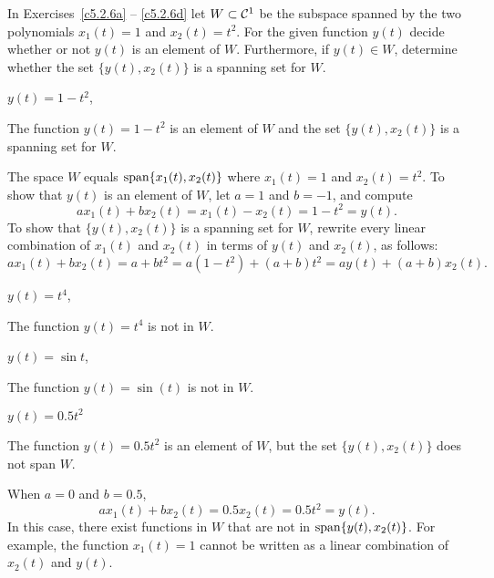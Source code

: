 \documentclass{ximera}
\begin{document}
\noindent In Exercises~\ref{c5.2.6a} -- \ref{c5.2.6d} let $W\subset{\cal C}^1$
be the subspace spanned by the two polynomials $x_1(t) = 1$ and
$x_2(t)=t^2$.  For the given function $y(t)$ decide whether or not $y(t)$
is an element of $W$.  Furthermore, if $y(t)\in W$, determine whether the set
$\{y(t),x_2(t)\}$ is a spanning set for $W$.
\begin{exercise} \label{c5.2.6a}
$y(t) = 1-t^2$,

\begin{solution}

\ans The function $y(t) = 1 - t^2$ is an element of $W$ and the set
$\{y(t),x_2(t)\}$ is a spanning set for $W$.



\soln The space $W$ equals ${\rm span}\{x_1(t),x_2(t)\}$ where $x_1(t)=1$ and 
$x_2(t)=t^2$.  To show that $y(t)$ is an element of $W$, let
$a = 1$ and $b = -1$, and compute
\[
ax_1(t) + bx_2(t) = x_1(t) - x_2(t) = 1 - t^2 = y(t). 
\]
To show that $\{y(t),x_2(t)\}$ is a spanning set for $W$, rewrite every
linear combination of $x_1(t)$ and $x_2(t)$ in terms of $y(t)$ and $x_2(t)$, 
as follows:
\[ 
ax_1(t) + bx_2(t) = a + bt^2 = a(1 - t^2) + (a + b)t^2
= ay(t) + (a + b)x_2(t). 
\]

\end{solution}
\end{exercise}
\begin{exercise} \label{c5.2.6b}
$y(t) = t^4$,

\begin{solution}
The function $y(t) = t^4$ is not in $W$.

\end{solution}
\end{exercise}
\begin{exercise} \label{c5.2.6c}
$y(t) = \sin t$,

\begin{solution}
The function $y(t) = \sin(t)$ is not in $W$.

\end{solution}
\end{exercise}
\begin{exercise} \label{c5.2.6d}
$y(t) = 0.5 t^2$

\begin{solution}

\ans The function $y(t) = 0.5t^2$ is an element of $W$, but the set
$\{y(t),x_2(t)\}$ does not span $W$.

\soln When $a = 0$ and $b = 0.5$,
\[ 
ax_1(t) + bx_2(t) = 0.5x_2(t) = 0.5t^2 = y(t). 
\]
In this case, there exist functions in $W$ that are not in 
${\rm span}\{y(t),x_2(t)\}$.  For example, the function $x_1(t) = 1$ cannot
be written as a linear combination of $x_2(t)$ and $y(t)$.

\end{solution}
\end{exercise}
\end{document}

